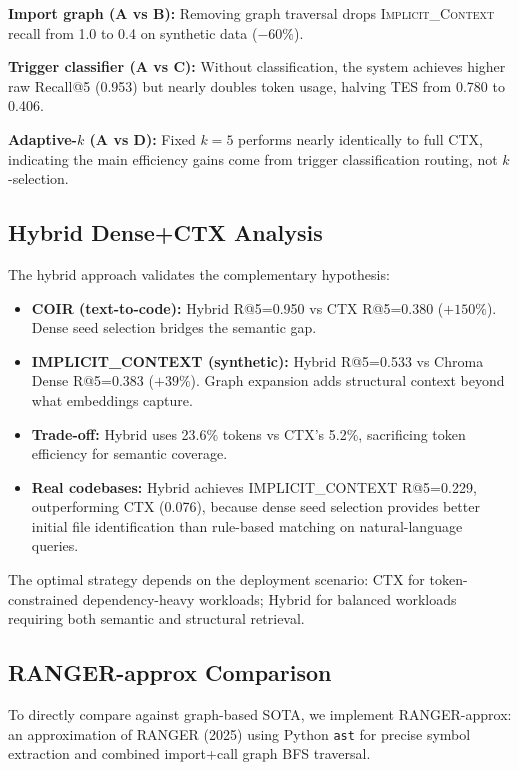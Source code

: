 \documentclass[11pt]{article}
\begin{document}
\textbf{Import graph (A vs B):} Removing graph traversal drops \textsc{Implicit\_Context} recall from 1.0 to 0.4 on synthetic data ($-60\%$).

\textbf{Trigger classifier (A vs C):} Without classification, the system achieves higher raw Recall@5 (0.953) but nearly doubles token usage, halving TES from 0.780 to 0.406.

\textbf{Adaptive-$k$ (A vs D):} Fixed $k=5$ performs nearly identically to full CTX, indicating the main efficiency gains come from trigger classification routing, not $k$-selection.

\subsection{Hybrid Dense+CTX Analysis}

The hybrid approach validates the complementary hypothesis:

\begin{itemize}
\item \textbf{COIR (text-to-code):} Hybrid R@5=0.950 vs CTX R@5=0.380 ($+150\%$). Dense seed selection bridges the semantic gap.
\item \textbf{IMPLICIT\_CONTEXT (synthetic):} Hybrid R@5=0.533 vs Chroma Dense R@5=0.383 ($+39\%$). Graph expansion adds structural context beyond what embeddings capture.
\item \textbf{Trade-off:} Hybrid uses 23.6\% tokens vs CTX's 5.2\%, sacrificing token efficiency for semantic coverage.
\item \textbf{Real codebases:} Hybrid achieves IMPLICIT\_CONTEXT R@5=0.229, outperforming CTX (0.076), because dense seed selection provides better initial file identification than rule-based matching on natural-language queries.
\end{itemize}

The optimal strategy depends on the deployment scenario: CTX for token-constrained dependency-heavy workloads; Hybrid for balanced workloads requiring both semantic and structural retrieval.

\subsection{RANGER-approx Comparison}
\label{sec:ranger_comparison}

To directly compare against graph-based SOTA, we implement RANGER-approx: an approximation of RANGER (2025) using Python \texttt{ast} for precise symbol extraction and combined import+call graph BFS traversal.
\end{document}

